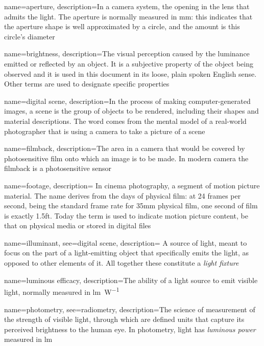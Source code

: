 



{
	name=aperture,
	description={In a camera system, the opening in the lens that admits the light.
		The aperture is normally measured in \unit{\milli\meter}: this indicates that 
		the aperture shape is well approximated by a circle, and the amount is this 
		circle's diameter}
}

{
  name=brightness,
  description={The visual perception caused by the luminance emitted or
    reflected by an object. It is a subjective property of the object being
    observed and it is used in this document in its loose, plain spoken
    English sense. Other terms are used to designate specific properties}
}

{
	name={digital scene},
	description={In the process of making computer-generated images, a scene is the group of
		objects to be rendered, including their shapes and material descriptions. 
		The word comes from the mental model of a real-world photographer that is using a 
		camera to take a picture of a scene}
}

{
	name=filmback,
	description={The area in a camera that would be covered by photosensitive film
		onto which an image is to be made. In modern camera the filmback is a photosensitive
		sensor}
}

{
	name=footage,
	description={
		In cinema photography, a segment of motion picture material. The name derives from
	    the days of physical film: at 24 frames per second, being the standard frame rate for
    	35\unit{\milli\meter} physical film, one second of film is exactly 1.5ft.
    	Today the term is used to indicate motion picture content, be that on physical
        media or stored in digital files}
}

{
	name=illuminant,
	see={digital scene},
	description={
		A source of light, meant to focus on the part of a light-emitting object that
	    specifically emits the light, as opposed to other elements of it. All together
        these constitute a \textsl{light fixture}}
}

{
	name={luminous efficacy},
	description={The ability of a light source to emit visible light, normally measured in
		\unit{\lumen\per\watt}}
}

{
	name={photometry},
	see={radiometry},
	description={The science of measurement of the strength of visible light, 
		through which are defined units that capture its perceived brightness 
		to the human eye. In photometry, light has \textsl{luminous power} 
		measured in \unit{\lumen}}
}


